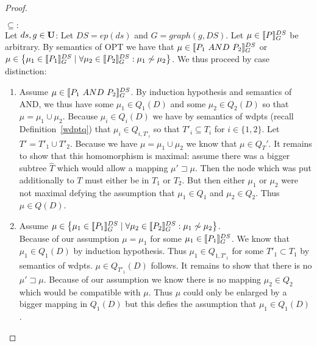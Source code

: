 \begin{proof}
\begin{enumerate}
			\bigskip\noindent
			$\subseteq:$\\
			Let $ds,g \in \mathbf{U}$:
			Let $DS = ep(ds)$ and $G = graph(g,DS)$.
			Let $\mu \in \llbracket P \rrbracket^{DS}_{G}$ be arbitrary. 
			By semantics of OPT we have that $\mu \in \llbracket P_1 \ AND \ P_2
			\rrbracket^{DS}_{G}$ or $\mu \in \big\{ \mu_1 \in \llbracket P_1 \rrbracket^{DS}_{G} \mid \forall \mu_2 \in \llbracket P_2
				\rrbracket^{DS}_{G}:
			\mu_1 \not\sim \mu_2 \big\}$. 
			We thus proceed by case distinction:
			\begin{enumerate}
				\item Assume $\mu \in \llbracket P_1 \ AND \ P_2 \rrbracket^{DS}_{G}$. By induction
					hypothesis and semantics of AND, we thus have some $\mu_1
					\in Q_1(D)$ and some $\mu_2 \in Q_2(D)$ so that $\mu = \mu_1
					\cup \mu_2$. Because $\mu_i \in Q_i(D)$ we have by semantics
					of wdpts (recall Definition~\ref{wdptq}) that $\mu_i \in Q_{i,T'_i}$ so that $T'_i \subseteq
					T_i$ for $i\in\{1,2\}$.
					Let $T' = T'_1 \cup T'_2$.
					Because we have $\mu = \mu_1 \cup \mu_2$ we know that $\mu
					\in Q_T'$.
					It remains to show that this homomorphism is maximal: assume there was a
					bigger subtree $\hat{T}$ which would allow a mapping $\mu'
					\sqsupset \mu$. Then the
					node which was put additionally to $T$ must either be in
					$T_1$ or $T_2$.
					But then either $\mu_1$ or $\mu_2$ were not maximal defying the assumption
					that $\mu_1 \in Q_1$ and $\mu_2 \in Q_2$.
					Thus $\mu \in Q(D)$. 

				\item Assume $\mu \in \big\{\mu_1 \in \llbracket P_1 \rrbracket^{DS}_{G} \mid 
					\forall \mu_2 \in \llbracket P_2 \rrbracket^{DS}_{G}: \mu_1 \not\sim \mu_2
				\big\}$. \\
					Because of our assumption $\mu = \mu_1$ for some $\mu_1 \in \llbracket P_1
					\rrbracket^{DS}_{G}$. We know that $\mu_1 \in Q_1(D)$ by induction
					hypothesis. Thus $\mu_1 \in Q_{1,T'_1}$ for some $T'_1
					\subset T_1$ by
					semantics of wdpts. $\mu \in Q_{T'_1}(D)$ follows.
					It remains to show that there is no $\mu' \sqsupset \mu$.
					Because of our assumption we know there is no mapping
					$\mu_2 \in Q_2$ which would be compatible with $\mu$. Thus $\mu$ could
					only be enlarged by a bigger mapping in $Q_1(D)$ but this defies the
					assumption that $\mu_1 \in Q_1(D)$.
			\end{enumerate}


\end{enumerate}
\end{proof}

